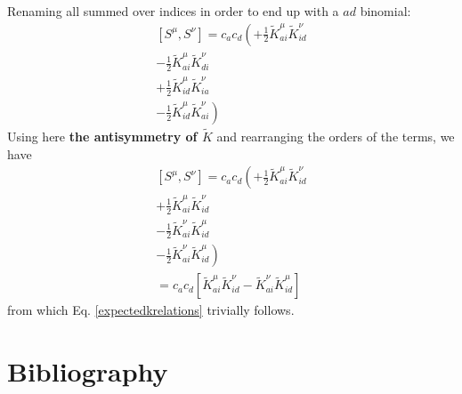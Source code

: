 \documentclass{article}
\newcommand{\ktilde}{\tilde{K}}
\newcommand{\onehalf}{\frac{1}{2}}
\begin{document}
Renaming all summed over indices in order to end up with a $ad$ binomial:
\begin{equation}
  \begin{aligned}
\left[S^\mu,S^\nu\right]  = c_ac_d \left(+ \onehalf \ktilde^\mu_{ai} \ktilde^\nu_{id} \right. \\
                          - \onehalf \ktilde^\mu_{ai}  \ktilde^\nu_{di} \\
                          + \onehalf \ktilde^\mu_{id}  \ktilde^\nu_{ia} \\
                          \left. - \onehalf \ktilde^\mu_{id}  \ktilde^\nu_{ai} \right)
  \end{aligned}
\end{equation}
Using here \textbf{the antisymmetry of $\ktilde$} and rearranging the orders of the terms,
we have
\begin{equation}
  \begin{aligned}
\left[S^\mu,S^\nu\right]  = c_ac_d \left(+ \onehalf \ktilde^\mu_{ai} \ktilde^\nu_{id} \right. \\
                          + \onehalf \ktilde^\mu_{ai}  \ktilde^\nu_{id} \\
                          - \onehalf  \ktilde^\nu_{ai} \ktilde^\mu_{id} \\
                          \left. - \onehalf \ktilde^\nu_{ai} \ktilde^\mu_{id}  \right) \\
                          = c_ac_d \left[ \ktilde^\mu_{ai}\ktilde^\nu_{id} - \ktilde^\nu_{ai}\ktilde^\mu_{id}\right]
  \end{aligned}
\end{equation}
from which Eq. \ref{expectedkrelations} trivially follows.



\section{Bibliography}
\end{document}
